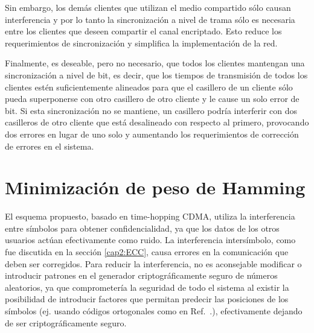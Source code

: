 Sin embargo, los demás clientes que utilizan el medio compartido sólo causan interferencia y por lo tanto la sincronización a nivel de trama sólo es necesaria entre los clientes que deseen compartir el canal encriptado. Esto reduce los requerimientos de sincronización y simplifica la implementación de la red.

Finalmente, es deseable, pero no necesario, que todos los clientes mantengan una sincronización a nivel de bit, es decir, que los tiempos de transmisión de todos los clientes estén suficientemente alineados para que el casillero de un cliente sólo pueda superponerse con otro casillero de otro cliente y le cause un solo error de bit. Si esta sincronización no se mantiene, un casillero podría interferir con dos casilleros de otro cliente que está desalineado con respecto al primero, provocando dos errores en lugar de uno solo y aumentando los requerimientos de corrección de errores en el sistema.

\section{Minimización de peso de Hamming}
\label{miniham}
El esquema propuesto, basado en time-hopping CDMA, utiliza la interferencia entre símbolos para obtener confidencialidad, ya que los datos de los otros usuarios actúan efectivamente como ruido.
La interferencia intersímbolo, como fue discutida en la sección \ref{cap2:ECC}, causa errores en la comunicación que deben ser corregidos. Para reducir la interferencia, no es aconsejable modificar o introducir patrones en el generador criptográficamente seguro de números aleatorios, ya que comprometería la seguridad de todo el sistema al existir la posibilidad de introducir factores que permitan predecir las posiciones de los símbolos (ej. usando códigos ortogonales como en Ref.~\cite{Nadarajah2006}.), efectivamente dejando de ser criptográficamente seguro.


